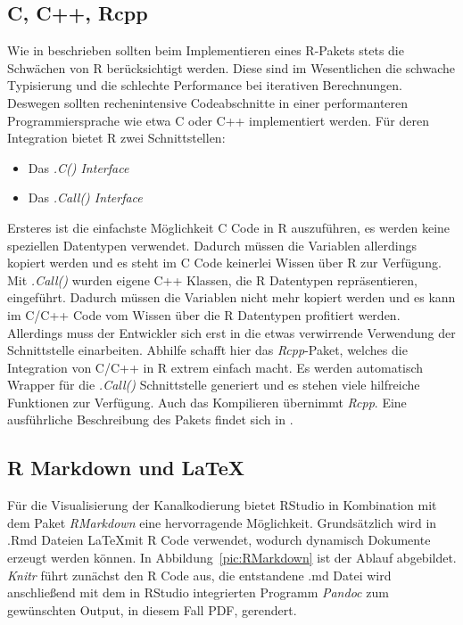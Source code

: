 \subsection{C, C++, Rcpp}

Wie in \cite{Rextension} beschrieben sollten beim Implementieren eines R-Pakets stets die Schwächen von R berücksichtigt werden. Diese sind im Wesentlichen die schwache Typisierung und die schlechte Performance bei iterativen Berechnungen. Deswegen sollten rechenintensive Codeabschnitte in einer performanteren Programmiersprache wie etwa C oder C++ implementiert werden. Für deren Integration bietet R zwei Schnittstellen:

\begin{itemize}
\item Das \emph{.C() Interface}
\item Das \emph{.Call() Interface}
\end{itemize}

Ersteres ist die einfachste Möglichkeit C Code in R auszuführen, es werden keine speziellen Datentypen verwendet. Dadurch müssen die Variablen allerdings kopiert werden und es steht im C Code keinerlei Wissen über R zur Verfügung.
Mit \emph{.Call()} wurden eigene C++ Klassen, die R Datentypen repräsentieren, eingeführt. Dadurch müssen die Variablen nicht mehr kopiert werden und es kann im C/C++ Code vom Wissen über die R Datentypen profitiert werden.\cite{wickham2015r} Allerdings muss der Entwickler sich erst in die etwas verwirrende Verwendung der Schnittstelle einarbeiten. Abhilfe schafft hier das \emph{Rcpp}-Paket, welches die Integration von C/C++ in R extrem einfach macht. Es werden automatisch Wrapper für die \emph{.Call()} Schnittstelle generiert und es stehen viele hilfreiche Funktionen zur Verfügung. Auch das Kompilieren übernimmt \emph{Rcpp}. Eine ausführliche Beschreibung des Pakets findet sich in \cite{wickham2015advanced}.

\subsection{R Markdown und \LaTeX}

Für die Visualisierung der Kanalkodierung bietet RStudio in Kombination mit dem Paket \emph{RMarkdown} eine hervorragende Möglichkeit. Grundsätzlich wird in .Rmd Dateien \LaTeX mit R Code verwendet, wodurch dynamisch Dokumente erzeugt werden können. In Abbildung~\ref{pic:RMarkdown} ist der Ablauf abgebildet. \emph{Knitr} führt zunächst den R Code aus, die entstandene .md Datei wird anschließend mit dem in RStudio integrierten Programm \emph{Pandoc} zum gewünschten Output, in diesem Fall PDF, gerendert.\cite{rmarkdown}


